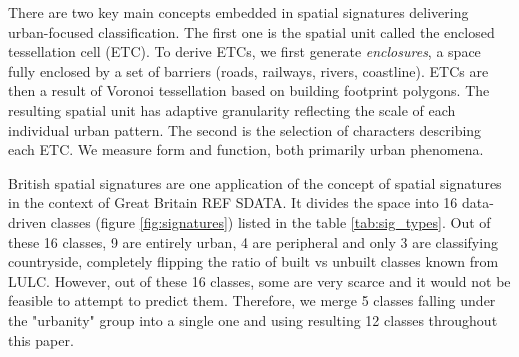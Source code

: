 There are two key main concepts embedded in spatial signatures delivering urban-focused
classification. The first one is the spatial unit called the enclosed tessellation cell
(ETC). To derive ETCs, we first generate \textit{enclosures}, a space fully enclosed by
a set of barriers (roads, railways, rivers, coastline). ETCs are then a result of
Voronoi tessellation based on building footprint polygons. The resulting spatial unit
has adaptive granularity reflecting the scale of each individual urban pattern. The
second is the selection of characters describing each ETC. We measure form and function,
both primarily urban phenomena.


British spatial signatures are one application of the concept of spatial signatures in
the context of Great Britain REF SDATA. It divides the space into 16 data-driven classes
(figure \ref{fig:signatures}) listed in the table \ref{tab:sig_types}. Out of these 16 classes, 9
are entirely urban, 4 are peripheral and only 3 are classifying countryside, completely
flipping the ratio of built vs unbuilt classes known from LULC. However, out of these 16
classes, some are very scarce and it would not be feasible to attempt to predict them.
Therefore, we merge 5 classes falling under the "urbanity" group into a single one and
using resulting 12 classes throughout this paper.


